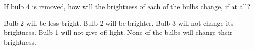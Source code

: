 \documentclass{../../oss-classkick-exam}
\begin{document}
\begin{multicols}{2}
\begin{questions}
    \question If bulb 4 is removed, how will the brightness of each of the bulbs
    change, if at all?
    \label{bulb2}
    \begin{choices}
      \choice Bulb 2 will be less bright.
      \choice Bulb 2 will be brighter.
      \choice Bulb 3 will not change its brightness.
      \choice Bulb 1 will not give off light.
      \choice None of the bulbs will change their brightness.
    \end{choices}
%    
%    
%
%    
%    
%    
  \end{questions}
\end{multicols}
\newpage
\end{document}
